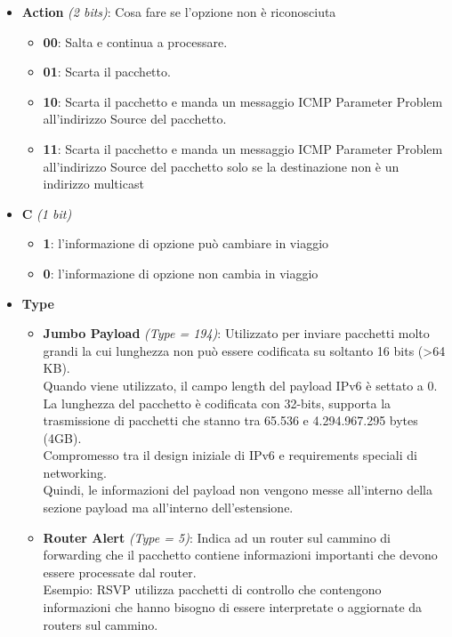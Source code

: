 \documentclass{article}
\begin{document}
\begin{itemize}
    \item \textbf{Action} \textit{(2 bits)}: Cosa fare se l'opzione non è riconosciuta
    \begin{itemize}
        \item \textbf{00}: Salta e continua a processare.
        \item \textbf{01}: Scarta il pacchetto.
        \item \textbf{10}: Scarta il pacchetto e manda un messaggio ICMP Parameter Problem all’indirizzo Source del pacchetto.
        \item \textbf{11}: Scarta il pacchetto e manda un messaggio ICMP Parameter Problem all’indirizzo Source del pacchetto solo se la destinazione non è un indirizzo multicast
    \end{itemize}{}
    \item \textbf{C} \textit{(1 bit)}
    \begin{itemize}
        \item \textbf{1}: l’informazione di opzione può cambiare in viaggio
        \item \textbf{0}: l’informazione di opzione non cambia in viaggio
    \end{itemize}
    \item \textbf{Type}
    \begin{itemize}
        \item \textbf{Jumbo Payload} \textit{(Type = 194)}:   Utilizzato per inviare pacchetti molto grandi la cui lunghezza non può essere codificata su soltanto 16 bits (>64 KB). \\ Quando viene utilizzato, il campo length del payload IPv6 è settato a 0. \\ La lunghezza del pacchetto è codificata con 32-bits, supporta la trasmissione di pacchetti che stanno tra 65.536 e 4.294.967.295 bytes (4GB).\\ Compromesso tra il design iniziale di IPv6 e requirements speciali di networking. \\ Quindi, le informazioni del payload non vengono messe all’interno della sezione payload ma all’interno dell’estensione.
        \item \textbf{Router Alert} \textit{(Type = 5)}: Indica ad un router sul cammino di forwarding che il pacchetto contiene informazioni importanti che devono essere processate dal router.\\ Esempio: RSVP utilizza pacchetti di controllo che contengono informazioni che hanno bisogno di essere interpretate o aggiornate da routers sul cammino.
    \end{itemize}
\end{itemize} 
\end{document}
